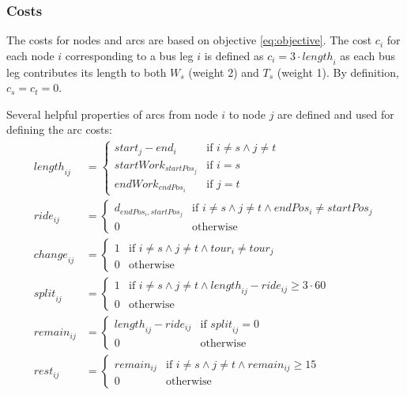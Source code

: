 \documentclass[]{amsart}
\theoremstyle{plain}
\begin{document}
\subsubsection{Costs}
The costs for nodes and arcs are based on objective \eqref{eq:objective}. The cost $c_i$ for each node $i$ corresponding to a bus leg $i$ is defined as $c_i=3\cdot\mathit{length}_i$ as each bus leg contributes its length to both $W_s$ (weight 2) and $T_s$ (weight 1). By definition, $c_s=c_t=0$. 

Several helpful properties of arcs from node $i$ to node $j$ are defined and used for defining the arc costs:
{\small
\begin{align}
    \label{eq:length}
    \mathit{length}_{ij} &= \begin{cases}\mathit{start}_j-\mathit{end}_i & \text{if }i\neq s\land j\neq t\\
    \mathit{startWork}_{\mathit{startPos}_j} & \text{if }i=s\\
    \mathit{endWork}_{\mathit{endPos}_i} & \text{if }j=t
    \end{cases}
    \\
    \label{eq:ride}
    \mathit{ride}_{ij} &= \begin{cases}d_{\mathit{endPos}_i,\mathit{startPos}_j} & \text{if }i\neq s\land j\neq t\land\mathit{endPos}_i\neq\mathit{startPos}_j\\
    0 & \text{otherwise}
    \end{cases}
    \\
    \label{eq:change}
    \mathit{change}_{ij} &= \begin{cases}1 & \text{if }i\neq s\land j\neq t\land\mathit{tour}_i\neq\mathit{tour}_j\\
    0 & \text{otherwise}
    \end{cases}
    \\
    \label{eq:split}
    \mathit{split}_{ij} &= \begin{cases}1 & \text{if }i\neq s\land j\neq t\land\mathit{length}_{ij}-\mathit{ride}_{ij}\geq3\cdot60\\
    0 & \text{otherwise}
    \end{cases}
    \\
    \label{eq:remain}
    \mathit{remain}_{ij} &= \begin{cases}\mathit{length}_{ij}-\mathit{ride}_{ij} & \text{if }\mathit{split}_{ij}=0\\
    0 & \text{otherwise}
    \end{cases}
    \\
    \label{eq:rest}
    \mathit{rest}_{ij} &= \begin{cases}\mathit{remain}_{ij} & \text{if }i\neq s\land j\neq t\land\mathit{remain}_{ij}\geq15\\
    0 & \text{otherwise}
    \end{cases}
\end{align}
}%
\end{document}
